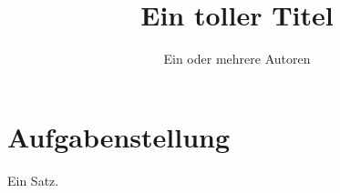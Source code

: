 


\frontmatter
\title{Ein toller Titel}
\author{Ein oder mehrere Autoren}
\maketitle
\tableofcontents

\mainmatter
\section{Aufgabenstellung}
    \label{sec:aufgabenstellung}
    Ein Satz.
